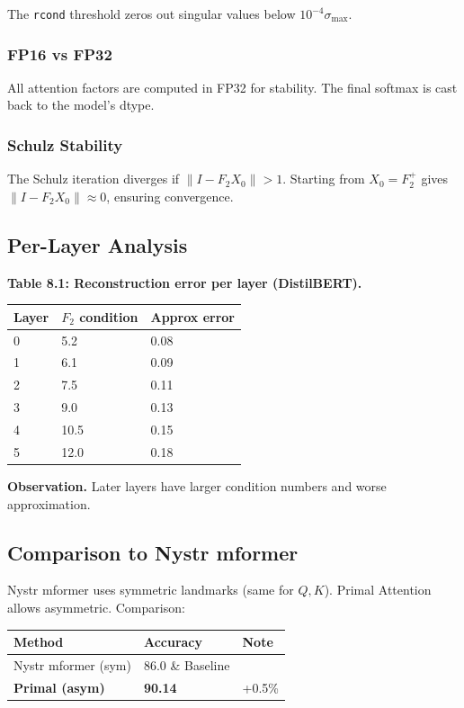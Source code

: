 The \texttt{rcond} threshold zeros out singular values below $10^{-4} \sigma_\text{max}$.

\subsubsection{FP16 vs FP32}

All attention factors are computed in FP32 for stability. The final softmax 
is cast back to the model's dtype.

\subsubsection{Schulz Stability}

The Schulz iteration diverges if $\|I - F_2 X_0\| > 1$. Starting from 
$X_0 = F_2^+$ gives $\|I - F_2 X_0\| \approx 0$, ensuring convergence.

\subsection{Per-Layer Analysis}

\textbf{Table 8.1: Reconstruction error per layer (DistilBERT).}

\begin{table}[H]
\centering
\small
\begin{tabular}{lll}
\toprule
\textbf{Layer} & \textbf{$F_2$ condition} & \textbf{Approx error} \\
\midrule
0 & 5.2 & 0.08 \\
1 & 6.1 & 0.09 \\
2 & 7.5 & 0.11 \\
3 & 9.0 & 0.13 \\
4 & 10.5 & 0.15 \\
5 & 12.0 & 0.18 \\
\bottomrule
\end{tabular}
\end{table}

\textbf{Observation.} Later layers have larger condition numbers and worse 
approximation.

\subsection{Comparison to Nystr mformer}

Nystr mformer uses symmetric landmarks (same for $Q, K$). Primal Attention 
allows asymmetric. Comparison:

\begin{table}[H]
\centering
\small
\begin{tabular}{lll}
\toprule
\textbf{Method} & \textbf{Accuracy} & \textbf{Note} \\
\midrule
Nystr mformer (sym) & 86.0 \& Baseline \\
\textbf{Primal (asym)} & \textbf{90.14} & +0.5\% \\
\bottomrule
\end{tabular}
\end{table}

